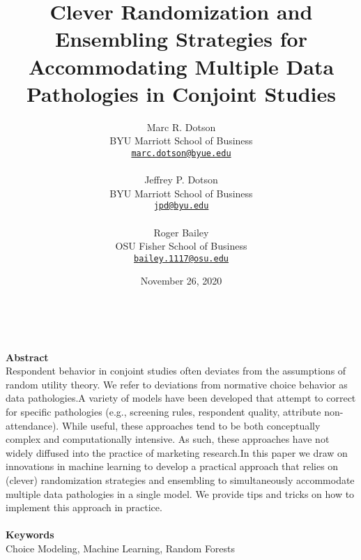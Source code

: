 \documentclass[12pt,titlepage]{mktg-article}
\begin{document}
\title{Clever Randomization and Ensembling Strategies for Accommodating Multiple Data Pathologies in Conjoint Studies}
\author{
    Marc R. Dotson\\
  BYU Marriott School of Business\\
  \href{mailto:marc.dotson@byue.edu}{\nolinkurl{marc.dotson@byue.edu}}\\
   \\   Jeffrey P. Dotson\\
  BYU Marriott School of Business\\
  \href{mailto:jpd@byu.edu}{\nolinkurl{jpd@byu.edu}}\\
   \\   Roger Bailey\\
  OSU Fisher School of Business\\
  \href{mailto:bailey.1117@osu.edu}{\nolinkurl{bailey.1117@osu.edu}}\\
  }
\date{November 26, 2020}

\maketitle
\doublespacing

\begin{center}
{}\\
\end{center}
\vspace{4mm}
\textbf{Abstract}\\
Respondent behavior in conjoint studies often deviates from the assumptions of random utility theory. We refer to deviations from normative choice behavior as data pathologies.A variety of models have been developed that attempt to correct for specific pathologies (e.g., screening rules, respondent quality, attribute non-attendance). While useful, these approaches tend to be both conceptually complex and computationally intensive. As such, these approaches have not widely diffused into the practice of marketing research.In this paper we draw on innovations in machine learning to develop a practical approach that relies on (clever) randomization strategies and ensembling to simultaneously accommodate multiple data pathologies in a single model. We provide tips and tricks on how to implement this approach in practice.
\\ \\
\noindent \textbf{Keywords}\\ 
Choice Modeling, Machine Learning, Random Forests
\end{document}
